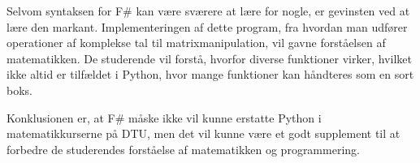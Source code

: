 \documentclass{article}
\begin{document}
Selvom syntaksen for F\# kan være sværere at lære for nogle, er gevinsten ved at lære den markant. Implementeringen af dette program, fra hvordan man udfører operationer af komplekse tal til matrixmanipulation, vil gavne forståelsen af matematikken. De studerende vil forstå, hvorfor diverse funktioner virker, hvilket ikke altid er tilfældet i Python, hvor mange funktioner kan håndteres som en sort boks.

Konklusionen er, at F\# måske ikke vil kunne erstatte Python i matematikkurserne på DTU, men det vil kunne være et godt supplement til at forbedre de studerendes forståelse af matematikken og programmering.



\newpage
\printbibliography

\newpage

\end{document}
